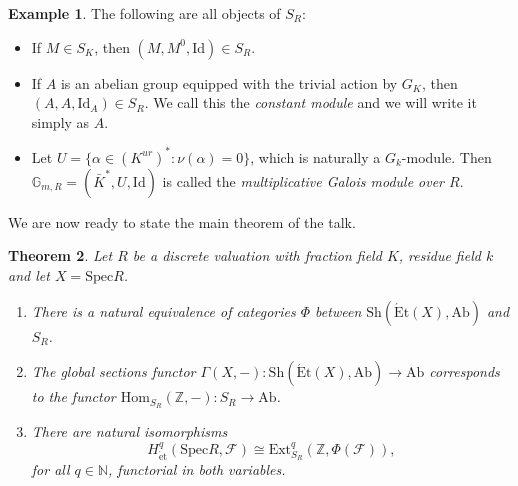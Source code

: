 \documentclass{article}
\newcommand{\Hom}{\mathrm{Hom}}
\newcommand{\ext}{\mathrm{Ext}}
\newcommand{\Spec}{\mathrm{Spec}}
\newcommand{\Ab}{\mathrm{Ab}}
\newcommand{\Et}{\acute{\mathrm{E}}\mathrm{t}}
\newcommand{\et}{\acute{\mathrm{e}}\mathrm{t}}
\newcommand{\Sh}{\mathrm{Sh}}
\newcommand{\Id}{\mathrm{Id}}
\newcommand{\N}{\mathbb{N}}
\newcommand{\Z}{\mathbb{Z}}
\theoremstyle{plain}
\newtheorem{theorem}{Theorem}[section]
\theoremstyle{definition}
\newtheorem{example}[theorem]{Example}
\begin{document}
    \begin{example}
        The following are all objects of $S_R$:
        \begin{itemize}
            \item If $M\in S_K$, then $(M,M^0,\Id)\in S_R$.
            \item If $A$ is an abelian group equipped with the trivial action by $G_K$, then $(A,A,\Id_A)\in S_R$. We call this the \textit{constant module} and we will write it simply as $A$.
            \item Let $U=\{\alpha\in (K^{ur})^*:\nu(\alpha)=0\}$, which is naturally a $G_k$-module. Then $\mathbb{G}_{m,R}=(\bar K^*,U,\Id)$ is called the \textit{multiplicative Galois module over $R$}.
        \end{itemize}
    \end{example}
    We are now ready to state the main theorem of the talk.
    \begin{theorem}\label{thm:etaleDVR}
        Let $R$ be a discrete valuation with fraction field $K$, residue field $k$ and let $X=\Spec R$.
        \begin{enumerate}
            \item There is a natural equivalence of categories $\Phi$ between $\Sh(\Et(X),\Ab)$ and $S_R$. 
            \item The global sections functor $\Gamma(X,-):\Sh(\Et(X),\Ab)\to\Ab$ corresponds to the functor $\Hom_{S_R}(\Z,-):S_R\to\Ab$.
            \item There are natural isomorphisms
            $$H^q_{\et}(\Spec R,\mathcal{F})\cong \ext_{S_R}^q(\Z,\Phi(\mathcal{F})),$$
            for all $q\in\N$, functorial in both variables.
        \end{enumerate}
    \end{theorem}
\end{document}
